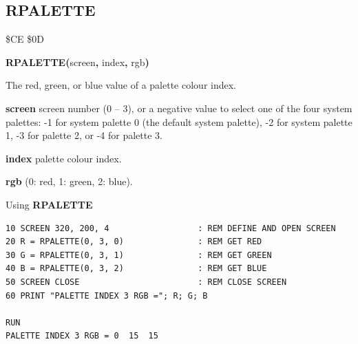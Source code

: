 
\newpage
\subsection{RPALETTE}
\begin{description}[leftmargin=2cm,style=nextline]
\item [Token:]    \$CE \$0D

\item [Format:]   {\bf RPALETTE(}screen{\bf,} index{\bf,} rgb{\bf)}

\item [Returns:]  The red, green, or blue value of a palette colour index.

                  {\bf screen} screen number (0 -- 3), or a negative value to select one of the four system palettes: -1 for system palette 0 (the default system palette), -2 for system palette 1, -3 for palette 2, or -4 for palette 3.

                  {\bf index} palette colour index.

                  {\bf rgb} (0: red, 1: green, 2: blue).

\item [Example:]  Using {\bf RPALETTE}

\begin{tcolorbox}[colback=black,coltext=white]
\verbatimfont{\codefont}
\begin{verbatim}
10 SCREEN 320, 200, 4                  : REM DEFINE AND OPEN SCREEN
20 R = RPALETTE(0, 3, 0)               : REM GET RED
30 G = RPALETTE(0, 3, 1)               : REM GET GREEN
40 B = RPALETTE(0, 3, 2)               : REM GET BLUE
50 SCREEN CLOSE                        : REM CLOSE SCREEN
60 PRINT "PALETTE INDEX 3 RGB ="; R; G; B

RUN
PALETTE INDEX 3 RGB = 0  15  15
\end{verbatim}
\end{tcolorbox}
\end{description}


\newpage
